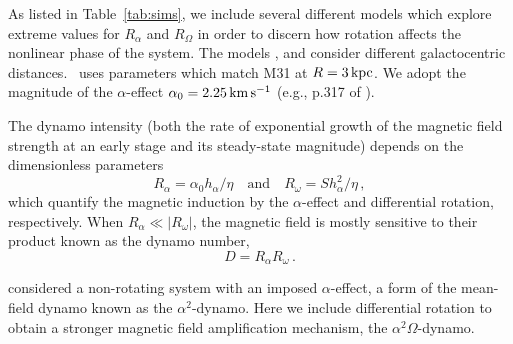 \documentclass[fleqn,usenatbib]{mnras}
\newcommand{\RAOASA}{{\sf{G25}}}
\newcommand{\RAOASACM}{{\sf{G25cr}}}
\newcommand{\RBOASACM}{{\sf{G50cr}}}
\newcommand{\km}{\,{\rm km}}    %
\newcommand{\kpc}{\,{\rm kpc}}  %
\newcommand{\s}{\,{\rm s}}      %
\newcommand{\kms}{\km\s^{-1}}    %
\begin{document}
As listed in Table~\ref{tab:sims}, we include several different models which
explore extreme values for $R_{\alpha}$ and $R_\Omega$ in order to discern how
rotation affects the nonlinear phase of the system. {The models {\RAOASA,
\RAOASACM} and {\RBOASACM} consider different galactocentric distances}.
{\RBOASACM\ uses parameters which match M31} at $R=3\kpc$. We adopt the
magnitude of the $\alpha$-effect $\alpha_0 = 2.25 \kms$ (e.g., p.317 of
\citealt{SS21}).

The dynamo intensity (both the rate of exponential growth of the magnetic field
strength at an early stage and its steady-state magnitude) depends on the
dimensionless parameters
\begin{equation}\label{Ral}
R_\alpha=\alpha_0 h_\alpha/\eta\quad \text{and} \quad   R_\omega=Sh_\alpha^2/\eta\,,
\end{equation}
which quantify the magnetic induction by the $\alpha$-effect and differential
rotation, respectively. When $R_{\alpha} \ll |R_\omega|$, the magnetic field is
mostly sensitive to their product known as the dynamo number,
\begin{equation}\label{DynNum}
     D=R_\alpha R_\omega\,.
\end{equation}

\citet{QSTGB23} considered a non-rotating system with an imposed
$\alpha$-effect, a form of the mean-field dynamo known as the
$\alpha^2$-dynamo. Here we include differential rotation to obtain a stronger
magnetic field amplification mechanism, the $\alpha^2\Omega$-dynamo.
\end{document}
